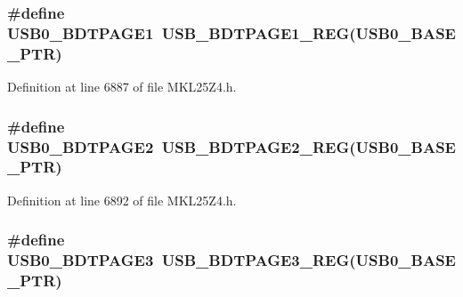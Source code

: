 \subsubsection[{\texorpdfstring{U\+S\+B0\+\_\+\+B\+D\+T\+P\+A\+G\+E1}{USB0_BDTPAGE1}}]{\setlength{\rightskip}{0pt plus 5cm}\#define U\+S\+B0\+\_\+\+B\+D\+T\+P\+A\+G\+E1~{\bf U\+S\+B\+\_\+\+B\+D\+T\+P\+A\+G\+E1\+\_\+\+R\+EG}({\bf U\+S\+B0\+\_\+\+B\+A\+S\+E\+\_\+\+P\+TR})}\hypertarget{group___u_s_b___register___accessor___macros_ga170f615c2294ee380456630f171f5c8e}{}\label{group___u_s_b___register___accessor___macros_ga170f615c2294ee380456630f171f5c8e}


Definition at line 6887 of file M\+K\+L25\+Z4.\+h.

\subsubsection[{\texorpdfstring{U\+S\+B0\+\_\+\+B\+D\+T\+P\+A\+G\+E2}{USB0_BDTPAGE2}}]{\setlength{\rightskip}{0pt plus 5cm}\#define U\+S\+B0\+\_\+\+B\+D\+T\+P\+A\+G\+E2~{\bf U\+S\+B\+\_\+\+B\+D\+T\+P\+A\+G\+E2\+\_\+\+R\+EG}({\bf U\+S\+B0\+\_\+\+B\+A\+S\+E\+\_\+\+P\+TR})}\hypertarget{group___u_s_b___register___accessor___macros_ga32d2c2911cc3729083c1a0f5cffa3ccf}{}\label{group___u_s_b___register___accessor___macros_ga32d2c2911cc3729083c1a0f5cffa3ccf}


Definition at line 6892 of file M\+K\+L25\+Z4.\+h.

\subsubsection[{\texorpdfstring{U\+S\+B0\+\_\+\+B\+D\+T\+P\+A\+G\+E3}{USB0_BDTPAGE3}}]{\setlength{\rightskip}{0pt plus 5cm}\#define U\+S\+B0\+\_\+\+B\+D\+T\+P\+A\+G\+E3~{\bf U\+S\+B\+\_\+\+B\+D\+T\+P\+A\+G\+E3\+\_\+\+R\+EG}({\bf U\+S\+B0\+\_\+\+B\+A\+S\+E\+\_\+\+P\+TR})}\hypertarget{group___u_s_b___register___accessor___macros_ga0676035b072b207c193ab9d43bcd56e8}{}\label{group___u_s_b___register___accessor___macros_ga0676035b072b207c193ab9d43bcd56e8}


